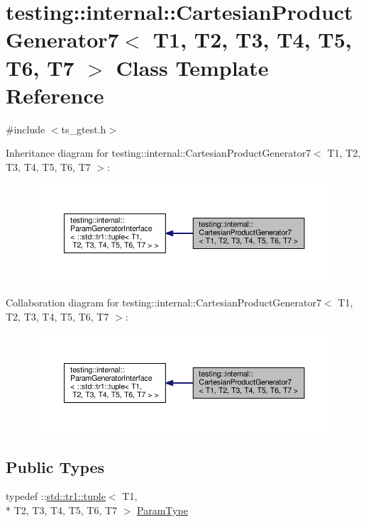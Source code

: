 \hypertarget{classtesting_1_1internal_1_1CartesianProductGenerator7}{\section{testing\-:\-:internal\-:\-:Cartesian\-Product\-Generator7$<$ T1, T2, T3, T4, T5, T6, T7 $>$ Class Template Reference}
\label{classtesting_1_1internal_1_1CartesianProductGenerator7}
}


{\ttfamily \#include $<$ts\-\_\-gtest.\-h$>$}



Inheritance diagram for testing\-:\-:internal\-:\-:Cartesian\-Product\-Generator7$<$ T1, T2, T3, T4, T5, T6, T7 $>$\-:\nopagebreak
\begin{figure}[H]
\begin{center}
\leavevmode
\includegraphics[width=350pt]{classtesting_1_1internal_1_1CartesianProductGenerator7__inherit__graph}
\end{center}
\end{figure}


Collaboration diagram for testing\-:\-:internal\-:\-:Cartesian\-Product\-Generator7$<$ T1, T2, T3, T4, T5, T6, T7 $>$\-:\nopagebreak
\begin{figure}[H]
\begin{center}
\leavevmode
\includegraphics[width=350pt]{classtesting_1_1internal_1_1CartesianProductGenerator7__coll__graph}
\end{center}
\end{figure}
\subsection*{Public Types}
\begin{DoxyCompactItemize}
\item 
typedef \-::\hyperlink{classstd_1_1tr1_1_1tuple}{std\-::tr1\-::tuple}$<$ T1, \\*
T2, T3, T4, T5, T6, T7 $>$ \hyperlink{classtesting_1_1internal_1_1CartesianProductGenerator7_ac749b651dcf74699c59f548cd33e40c1}{Param\-Type}
\end{DoxyCompactItemize}
